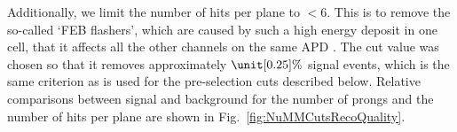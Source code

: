 Additionally, we limit the number of hits per plane to $<6$. This is to remove the so-called `\gls{FEB} flashers', which are caused by such a high energy deposit in one cell, that it affects all the other channels on the same \gls{APD} \cite{NOvA-doc-37668}. The cut value was chosen so that it removes approximately $\unit[0.25]{\%}$ signal events, which is the same criterion as is used for the pre-selection cuts described below. Relative comparisons between signal and background for the number of prongs and the number of hits per plane are shown in Fig.~\ref{fig:NuMMCutsRecoQuality}.



